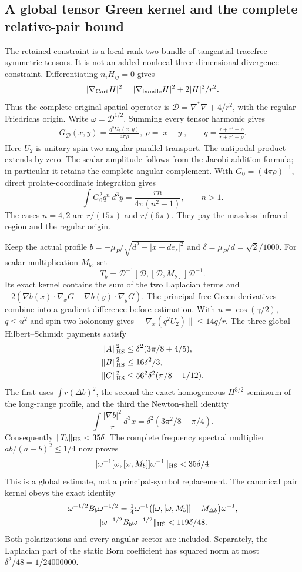 \subsection{A global tensor Green kernel and the complete relative-pair bound}
The retained constraint is a local rank-two bundle of tangential tracefree
symmetric tensors.  It is not an added nonlocal three-dimensional divergence
constraint.  Differentiating $n_iH_{ij}=0$ gives
\[
 |\nabla_{\rm Cart}H|^2=|\nabla_{\rm bundle}H|^2+2|H|^2/r^2.
\]
Thus the complete original spatial operator is
$\mathcal D=\nabla^*\nabla+4/r^2$, with the regular Friedrichs origin.
Write $\omega=\mathcal D^{1/2}$.  Summing every tensor harmonic gives
\[
 \begin{gathered}
 G_{\mathcal D}(x,y)=\frac{q^2U_2(x,y)}{4\pi\rho},\
 \rho=|x-y|,\qquad
 q=\frac{r+r'-\rho}{r+r'+\rho}.
 \end{gathered}
\]
Here $U_2$ is unitary spin-two angular parallel transport.  The antipodal
product extends by zero.  The scalar amplitude follows from the Jacobi
addition formula; in particular it retains the complete angular complement.
With $G_0=(4\pi\rho)^{-1}$, direct prolate-coordinate integration gives
\[
 \int G_0^2q^n\,d^3y=\frac{rn}{4\pi(n^2-1)},\qquad n>1.
\]
The cases $n=4,2$ are $r/(15\pi)$ and $r/(6\pi)$.
They pay the massless infrared region and the regular origin.

Keep the actual profile
$b=-\mu_P/\sqrt{d^2+|x-d e_z|^2}$ and
$\delta=\mu_P/d=\sqrt2/1000$.  For scalar multiplication $M_b$, set
\[
 T_b=\mathcal D^{-1}[\mathcal D,[\mathcal D,M_b]]\mathcal D^{-1}.
\]
Its exact kernel contains the sum of the two Laplacian terms and
$-2(\nabla b(x)\cdot\nabla_xG+\nabla b(y)\cdot\nabla_yG)$.
The principal free-Green derivatives combine into a gradient difference
before estimation.  With $u=\cos(\gamma/2)$, $q\le u^2$ and spin-two
holonomy gives
$\|\nabla_x(q^2U_2)\|\le14q/r$.
The three global Hilbert--Schmidt payments satisfy
\[
 \begin{aligned}
 \|A\|_{\rm HS}^2&\le\delta^2(3\pi/8+4/5),\\
 \|B\|_{\rm HS}^2&\le16\delta^2/3,\\
 \|C\|_{\rm HS}^2&\le56^2\delta^2(\pi/8-1/12).
 \end{aligned}
\]
The first uses $\int r(\Delta b)^2$, the second the exact homogeneous
$H^{3/2}$ seminorm of the long-range profile, and the third the Newton-shell
identity
\[
 \int\frac{|\nabla b|^2}{r}\,d^3x
 =\delta^2(3\pi^2/8-\pi/4).
\]
Consequently $\|T_b\|_{\rm HS}<35\delta$.  The complete frequency spectral
multiplier $ab/(a+b)^2\le1/4$ now proves
\[
 \|\omega^{-1}[\omega,[\omega,M_b]]\omega^{-1}\|_{\rm HS}
 <35\delta/4.
\]
This is a global estimate, not a principal-symbol replacement.
The canonical pair kernel obeys the exact identity
\[
 \begin{gathered}
 \omega^{-1/2}B_b\omega^{-1/2}
 =\tfrac14\omega^{-1}
 \bigl([\omega,[\omega,M_b]]+M_{\Delta b}\bigr)\omega^{-1},\\
 \|\omega^{-1/2}B_b\omega^{-1/2}\|_{\rm HS}<119\delta/48.
 \end{gathered}
\]
Both polarizations and every angular sector are included.  Separately, the
Laplacian part of the static Born coefficient has squared norm at most
$\delta^2/48=1/24000000$.

